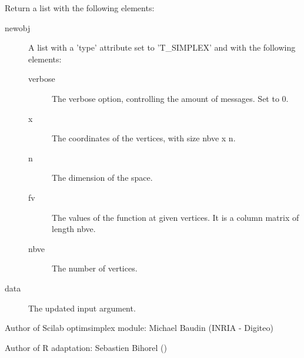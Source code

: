 \begin{Value}
Return a list with the following elements: \begin{description}

\item[newobj] A list with a 'type' attribute set to 'T\_SIMPLEX' and with
the following elements: \begin{description}

\item[verbose] The verbose option, controlling the amount of messages.
Set to 0.
\item[x] The coordinates of the vertices, with size nbve x n.
\item[n] The dimension of the space.
\item[fv] The values of the function at given vertices. It is a column
matrix of length nbve.
\item[nbve] The number of vertices.

\end{description}


\item[data] The updated  input argument.

\end{description}

\end{Value}
%
\begin{Author}\relax
Author of Scilab optimsimplex module: Michael Baudin (INRIA - Digiteo)

Author of R adaptation: Sebastien Bihorel ()
\end{Author}
%

